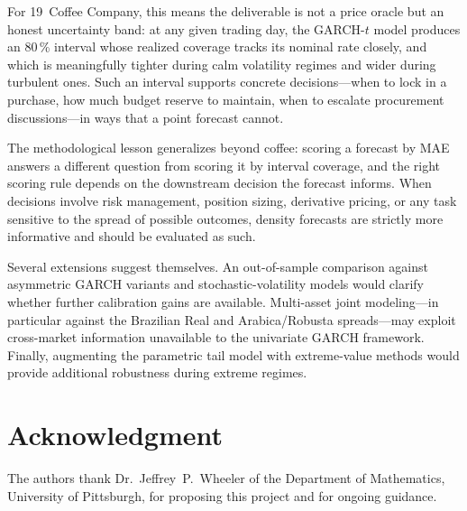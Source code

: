 \documentclass[journal]{IEEEtran}
\begin{document}
For 19~Coffee Company, this means the deliverable is not a price oracle
but an honest uncertainty band: at any given trading day, the GARCH-$t$
model produces an 80\,\% interval whose realized coverage tracks its
nominal rate closely, and which is meaningfully tighter during calm
volatility regimes and wider during turbulent ones.  Such an interval
supports concrete decisions---when to lock in a purchase, how much
budget reserve to maintain, when to escalate procurement
discussions---in ways that a point forecast cannot.

The methodological lesson generalizes beyond coffee: scoring a forecast
by MAE answers a different question from scoring it by interval coverage,
and the right scoring rule depends on the downstream decision the forecast
informs.  When decisions involve risk management, position sizing,
derivative pricing, or any task sensitive to the spread of possible
outcomes, density forecasts are strictly more informative and should be
evaluated as such.

Several extensions suggest themselves.  An out-of-sample comparison
against asymmetric GARCH variants and stochastic-volatility models would
clarify whether further calibration gains are available.  Multi-asset
joint modeling---in particular against the Brazilian Real and Arabica/Robusta
spreads---may exploit cross-market information unavailable to the
univariate GARCH framework.  Finally, augmenting the parametric tail
model with extreme-value methods would provide additional robustness
during extreme regimes.

\section*{Acknowledgment}

The authors thank Dr.~Jeffrey~P.~Wheeler of the Department of Mathematics,
University of Pittsburgh, for proposing this project and for ongoing guidance.



\end{document}
